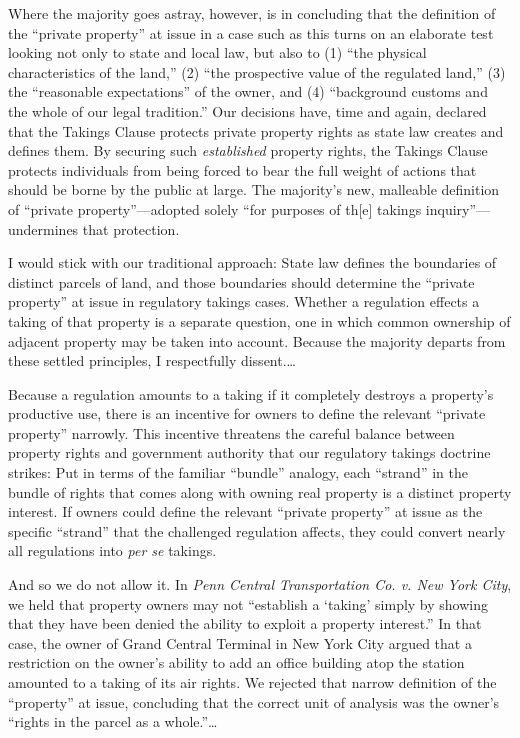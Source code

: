 Where the majority goes astray, however, is in concluding that the definition of
the ``private property'' at issue in a case such as this turns on an elaborate
test looking not only to state and local law, but also to (1) ``the physical
characteristics of the land,'' (2) ``the prospective value of the regulated
land,'' (3) the ``reasonable expectations'' of the owner, and (4) ``background
customs and the whole of our legal tradition.'' Our decisions have, time and
again, declared that the Takings Clause protects private property rights as
state law creates and defines them. By securing such \textit{established}
property rights, the Takings Clause protects individuals from being forced to
bear the full weight of actions that should be borne by the public at large. The
majority's new, malleable definition of ``private property''---adopted solely
``for purposes of th[e] takings inquiry''---undermines that protection.

I would stick with our traditional approach: State law defines the boundaries of
distinct parcels of land, and those boundaries should determine the ``private
property'' at issue in regulatory takings cases. Whether a regulation effects a
taking of that property is a separate question, one in which common ownership of
adjacent property may be taken into account. Because the majority departs from
these settled principles, I respectfully dissent.\ldots

Because a regulation amounts to a taking if it completely destroys a property's
productive use, there is an incentive for owners to define the relevant
``private property'' narrowly. This incentive threatens the careful balance
between property rights and government authority that our regulatory takings
doctrine strikes: Put in terms of the familiar ``bundle'' analogy, each
``strand'' in the bundle of rights that comes along with owning real property is
a distinct property interest. If owners could define the relevant ``private
property'' at issue as the specific ``strand'' that the challenged regulation
affects, they could convert nearly all regulations into \textit{per se}
takings.

And so we do not allow it. In \textit{Penn Central Transportation Co. v. New
York City}, we held that property owners may not ``establish a `taking' simply
by showing that they have been denied the ability to exploit a property
interest.'' In that case, the owner of Grand Central Terminal in New York City
argued that a restriction on the owner's ability to add an office building atop
the station amounted to a taking of its air rights. We rejected that narrow
definition of the ``property'' at issue, concluding that the correct unit of
analysis was the owner's ``rights in the parcel as a whole.''\ldots

